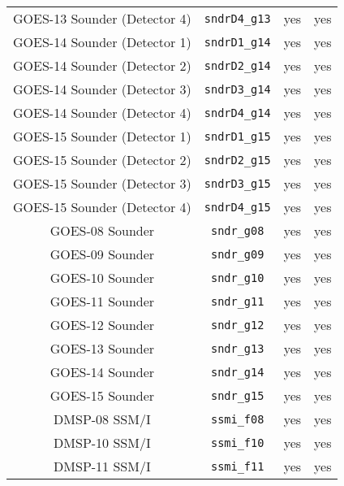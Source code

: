 \begin{center}
\begin{longtable}{c c c c}
  GOES-13 Sounder (Detector 4)       & \texttt{sndrD4\_g13}         &  yes     &  yes       \\
  GOES-14 Sounder (Detector 1)       & \texttt{sndrD1\_g14}         &  yes     &  yes       \\
  GOES-14 Sounder (Detector 2)       & \texttt{sndrD2\_g14}         &  yes     &  yes       \\
  GOES-14 Sounder (Detector 3)       & \texttt{sndrD3\_g14}         &  yes     &  yes       \\
  GOES-14 Sounder (Detector 4)       & \texttt{sndrD4\_g14}         &  yes     &  yes       \\
  GOES-15 Sounder (Detector 1)       & \texttt{sndrD1\_g15}         &  yes     &  yes       \\
  GOES-15 Sounder (Detector 2)       & \texttt{sndrD2\_g15}         &  yes     &  yes       \\
  GOES-15 Sounder (Detector 3)       & \texttt{sndrD3\_g15}         &  yes     &  yes       \\
  GOES-15 Sounder (Detector 4)       & \texttt{sndrD4\_g15}         &  yes     &  yes       \\
  GOES-08 Sounder                    & \texttt{sndr\_g08}           &  yes     &  yes       \\
  GOES-09 Sounder                    & \texttt{sndr\_g09}           &  yes     &  yes       \\
  GOES-10 Sounder                    & \texttt{sndr\_g10}           &  yes     &  yes       \\
  GOES-11 Sounder                    & \texttt{sndr\_g11}           &  yes     &  yes       \\
  GOES-12 Sounder                    & \texttt{sndr\_g12}           &  yes     &  yes       \\
  GOES-13 Sounder                    & \texttt{sndr\_g13}           &  yes     &  yes       \\
  GOES-14 Sounder                    & \texttt{sndr\_g14}           &  yes     &  yes       \\
  GOES-15 Sounder                    & \texttt{sndr\_g15}           &  yes     &  yes       \\
  DMSP-08 SSM/I                      & \texttt{ssmi\_f08}           &  yes     &  yes       \\
  DMSP-10 SSM/I                      & \texttt{ssmi\_f10}           &  yes     &  yes       \\
  DMSP-11 SSM/I                      & \texttt{ssmi\_f11}           &  yes     &  yes       \\

\end{longtable}
\end{center}
